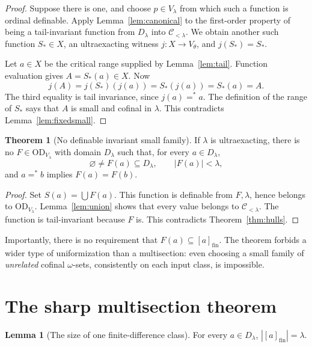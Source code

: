 \documentclass[11pt,letterpaper]{article}
\theoremstyle{definition}
\newtheorem{theorem}[definition]{Theorem}
\newtheorem{lemma}[definition]{Lemma}
\numberwithin{equation}{section}
\newcommand{\OD}{\mathrm{OD}}
\newcommand{\eqfin}{\mathrel{=^{*}}}
\newcommand{\cl}[1]{[#1]_{\mathrm{fin}}}
\begin{document}
\begin{proof}
Suppose there is one, and choose $p\in V_\lambda$ from which such a function is ordinal definable. Apply Lemma~\ref{lem:canonical} to the first-order property of being a tail-invariant function from $D_\lambda$ into $\mathcal C_{<\lambda}$. We obtain another such function $S_*\in X$, an ultraexacting witness $j:X\to V_\theta$, and $j(S_*)=S_*$.

Let $a\in X$ be the critical range supplied by Lemma~\ref{lem:tail}. Function evaluation gives $A=S_*(a)\in X$. Now
\begin{equation}\label{eq:fixedhull}
 j(A)=j(S_*)(j(a))=S_*(j(a))=S_*(a)=A.
\end{equation}
The third equality is tail invariance, since $j(a)\eqfin a$. The definition of the range of $S_*$ says that $A$ is small and cofinal in $\lambda$. This contradicts Lemma~\ref{lem:fixedsmall}.
\end{proof}

\begin{theorem}[No definable invariant small family]\label{thm:families}
If $\lambda$ is ultraexacting, there is no $F\in\OD_{V_\lambda}$ with domain $D_\lambda$ such that, for every $a\in D_\lambda$,
\[
 \varnothing\ne F(a)\subseteq D_\lambda,
 \qquad |F(a)|<\lambda,
\]
and $a\eqfin b$ implies $F(a)=F(b)$.
\end{theorem}

\begin{proof}
Set $S(a)=\bigcup F(a)$. This function is definable from $F,\lambda$, hence belongs to $\OD_{V_\lambda}$. Lemma~\ref{lem:union} shows that every value belongs to $\mathcal C_{<\lambda}$. The function is tail-invariant because $F$ is. This contradicts Theorem~\ref{thm:hulls}.
\end{proof}

Importantly, there is no requirement that $F(a)\subseteq\cl a$. The theorem forbids a wider type of uniformization than a multisection: even choosing a small family of \emph{unrelated} cofinal $\omega$-sets, consistently on each input class, is impossible.

\section{The sharp multisection theorem}\label{sec:multisections}

\begin{lemma}[The size of one finite-difference class]\label{lem:classsize}
For every $a\in D_\lambda$, $|\cl a|=\lambda$.
\end{lemma}
\end{document}
